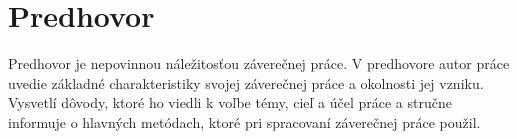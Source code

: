 \chapter*{Predhovor}
\thispagestyle{empty}

Predhovor je nepovinnou náležitosťou záverečnej práce. V predhovore autor práce uvedie základné charakteristiky svojej záverečnej práce a okolnosti jej vzniku. Vysvetlí dôvody, ktoré ho viedli k voľbe témy, cieľ a účel práce a stručne informuje o hlavných metódach, ktoré pri spracovaní záverečnej práce  použil.

\cleardoublepage
